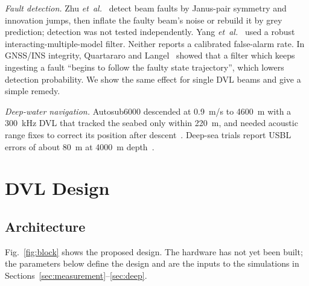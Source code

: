 \documentclass[conference]{IEEEtran}
\begin{document}
\emph{Fault detection.} Zhu \emph{et~al.}~\cite{zhu2025} detect beam faults by Janus-pair symmetry and innovation jumps, then inflate the faulty beam's noise or rebuild it by grey prediction; detection was not tested independently. Yang \emph{et~al.}~\cite{yang2022} used a robust interacting-multiple-model filter. Neither reports a calibrated false-alarm rate. In GNSS/INS integrity, Quartararo and Langel~\cite{quartararo2022} showed that a filter which keeps ingesting a fault ``begins to follow the faulty state trajectory'', which lowers detection probability. We show the same effect for single DVL beams and give a simple remedy.

\emph{Deep-water navigation.} Autosub6000 descended at 0.9~m/s to 4600~m with a 300~kHz DVL that tracked the seabed only within 220~m, and needed acoustic range fixes to correct its position after descent~\cite{mcphail2008}. Deep-sea trials report USBL errors of about 80~m at 4000~m depth~\cite{liu2024}.

\section{DVL Design}
\label{sec:design}

\subsection{Architecture}

Fig.~\ref{fig:block} shows the proposed design. The hardware has not yet been built; the parameters below define the design and are the inputs to the simulations in Sections~\ref{sec:measurement}--\ref{sec:deep}.
\end{document}
